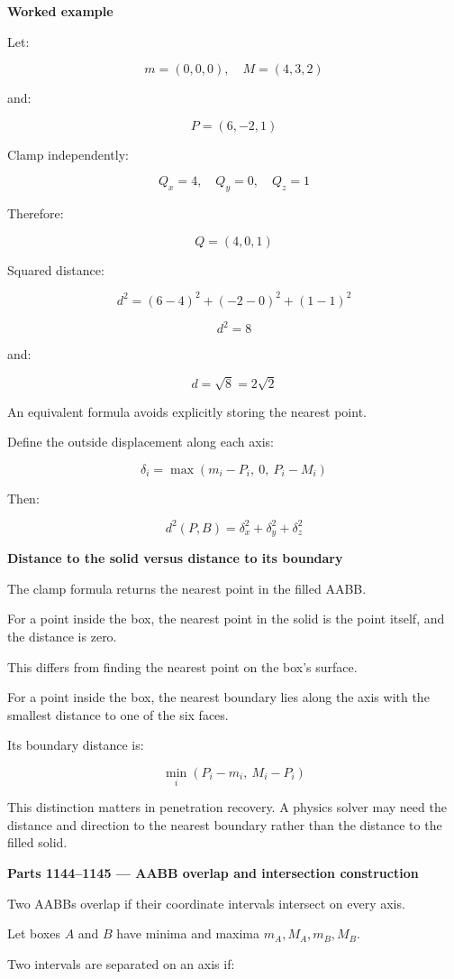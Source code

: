 \textbf{Worked example}

Let:

\[
m=(0,0,0),\quad M=(4,3,2)
\]

and:

\[
P=(6,-2,1)
\]

Clamp independently:

\[
Q_x=4,\quad Q_y=0,\quad Q_z=1
\]

Therefore:

\[
\boxed{Q=(4,0,1)}
\]

Squared distance:

\[
d^2=(6-4)^2+(-2-0)^2+(1-1)^2
\]

\[
\boxed{d^2=8}
\]

and:

\[
d=\sqrt8=2\sqrt2
\]

An equivalent formula avoids explicitly storing the nearest point.

Define the outside displacement along each axis:

\[
\delta_i=\max(m_i-P_i,\ 0,\ P_i-M_i)
\]

Then:

\[
\boxed{ d^2(P,B)=\delta_x^2+\delta_y^2+\delta_z^2 }
\]

\textbf{Distance to the solid versus distance to its boundary}

The clamp formula returns the nearest point in the filled AABB.

For a point inside the box, the nearest point in the solid is the point itself, and the distance is zero.

This differs from finding the nearest point on the box's surface.

For a point inside the box, the nearest boundary lies along the axis with the smallest distance to one of the six faces.

Its boundary distance is:

\[
\min_i(P_i-m_i,\ M_i-P_i)
\]

This distinction matters in penetration recovery. A physics solver may need the distance and direction to the nearest boundary rather than the distance to the filled solid.

\textbf{Parts 1144--1145 --- AABB overlap and intersection construction}

Two AABBs overlap if their coordinate intervals intersect on every axis.

Let boxes \(A\) and \(B\) have minima and maxima \(m_A,M_A,m_B,M_B\).

Two intervals are separated on an axis if:

